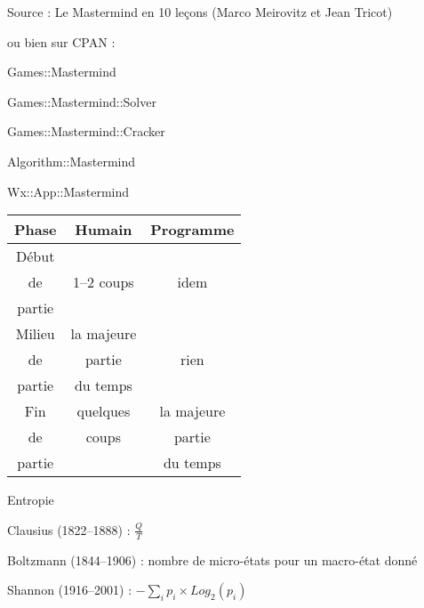 \documentclass{slides}
\begin{document}
\begin{slide}

Source : Le Mastermind en 10 leçons
(Marco Meirovitz et Jean Tricot)

ou bien sur CPAN :

Games::Mastermind

Games::Mastermind::Solver

Games::Mastermind::Cracker

Algorithm::Mastermind

Wx::App::Mastermind

\end{slide}
\begin{slide}

\begin{tabular}{|c|c|c|}
\hline
Phase  & Humain & Programme \\
\hline
Début  &        & \\
  de   & 1--2 coups  & idem \\
partie &        & \\
\hline
Milieu & la majeure & \\
  de   & partie     & rien \\
partie & du temps   & \\
\hline
 Fin   & quelques   & la majeure \\
  de   & coups      & partie     \\
partie &            & du temps   \\
\hline
\end{tabular}

\end{slide}
\begin{slide}

\begin{center}
Entropie
\end{center}

Clausius (1822--1888) : $ \frac{Q}{T} $

Boltzmann (1844--1906) : nombre de micro-états pour un macro-état donné

Shannon (1916--2001) : $- \sum_i p_i \times Log_2(p_i)$

\end{slide}
\end{document}
